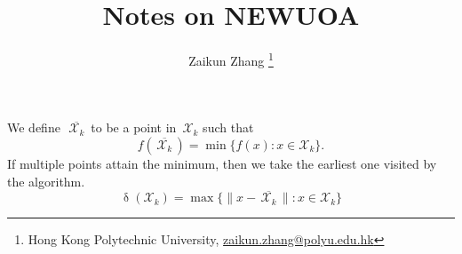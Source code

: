 \documentclass[11pt,a4paper,draft]{article}  %
\title{Notes on NEWUOA}
\date{\DTMnow}
\author{Zaikun Zhang
    \thanks{Hong Kong Polytechnic University, \url{zaikun.zhang@polyu.edu.hk}}
}
\theoremstyle{definition}
\numberwithin{equation}{section}
\newcommand{\mbar}[1]{\,\overline{\!{#1}\!}\,} %
\newcommand{\xopt}{\mbar}
\DeclareMathOperator{\xdist}{\updelta}
\newcommand{\Int}{\mathcal{X}}
\begin{document}
\maketitle



We define~$\xopt{\Int_k}$ to be a point in~$\Int_k$ such that
\begin{equation}
    \label{eq:xopt}
    f(\xopt{\Int_k}) = \min\{f(x) \mathrel{:} x\in \Int_k\}.
\end{equation}
If multiple points attain the minimum, then we take the earliest one visited by the algorithm.
\begin{equation}
    \label{eq:xdist}
    \xdist(\Int_k) = \max\{\|x-\xopt{\Int_k}\| \mathrel{:} x\in \Int_k\}
\end{equation}
\end{document}
